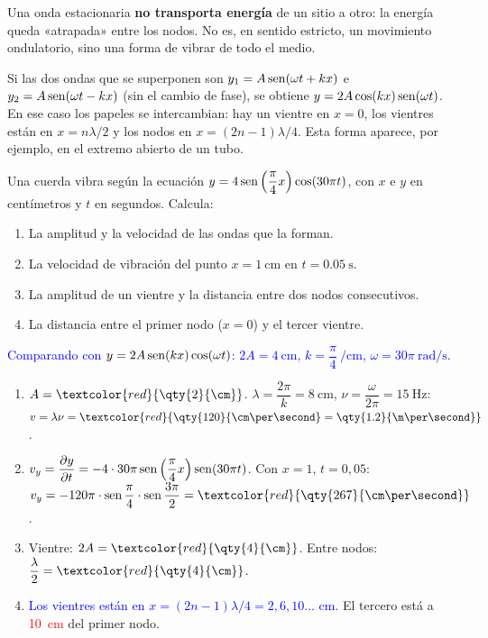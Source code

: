 \begin{remark}
    Una onda estacionaria \textbf{no transporta energía} de un sitio a otro: la energía queda «atrapada» entre los nodos.
    No es, en sentido estricto, un movimiento ondulatorio, sino una forma de vibrar de todo el medio.
\end{remark}

Si las dos ondas que se superponen son \(y_1 = A\operatorname{sen}(\omega t + kx)\) e \(y_2 = A\operatorname{sen}(\omega t - kx)\) (sin el cambio de
fase), se obtiene \(y = 2A\cos(kx)\operatorname{sen}(\omega t)\). En ese caso los papeles se intercambian: hay un vientre en \(x = 0\), los
vientres están en \(x = n\lambda/2\) y los nodos en \(x = (2n - 1)\lambda/4\). Esta forma aparece, por ejemplo, en el
extremo abierto de un tubo.

\begin{exercise}
    Una cuerda vibra según la ecuación \(y = 4\operatorname{sen}\left(\dfrac{\pi}{4}x\right)\cos(30\pi t)\), con \(x\) e \(y\) en
    centímetros y \(t\) en segundos. Calcula:
    \begin{enumerate}[label=\letraminuscula]
        \item La amplitud y la velocidad de las ondas que la forman.
        \item La velocidad de vibración del punto \(x = \qty{1}{\cm}\) en \(t = \qty{0.05}{\second}\).
        \item La amplitud de un vientre y la distancia entre dos nodos consecutivos.
        \item La distancia entre el primer nodo (\(x = 0\)) y el tercer vientre.
    \end{enumerate}
    \begin{solu}
        \textcolor{blue}{Comparando con \(y = 2A\operatorname{sen}(kx)\cos(\omega t)\): \(2A = \qty{4}{\cm}\), \(k = \dfrac{\pi}{4}\ \unit{\per\cm}\), \(\omega = 30\pi\ \unit{\radian\per\second}\).}
        \begin{enumerate}[label=\letraminuscula]
            \item \(A = \textcolor{red}{\qty{2}{\cm}}\). \(\lambda = \dfrac{2\pi}{k} = \qty{8}{\cm}\), \(\nu = \dfrac{\omega}{2\pi} = \qty{15}{\hertz}\):
            \(v = \lambda\nu = \textcolor{red}{\qty{120}{\cm\per\second} = \qty{1.2}{\m\per\second}}\).
            \item \(v_y = \dfrac{\partial y}{\partial t} = -4\cdot 30\pi\operatorname{sen}\left(\dfrac{\pi}{4}x\right)\operatorname{sen}(30\pi t)\).
            Con \(x = 1\), \(t = 0{,}05\): \(v_y = -120\pi\cdot\sen\dfrac{\pi}{4}\cdot\sen\dfrac{3\pi}{2} = \textcolor{red}{\qty{267}{\cm\per\second}}\).
            \item Vientre: \(2A = \textcolor{red}{\qty{4}{\cm}}\). Entre nodos: \(\dfrac{\lambda}{2} = \textcolor{red}{\qty{4}{\cm}}\).
            \item \textcolor{blue}{Los vientres están en \(x = (2n - 1)\lambda/4 = 2, 6, 10\ldots\) cm.} El tercero está a \textcolor{red}{\qty{10}{\cm}} del primer nodo.
        \end{enumerate}
    \end{solu}
\end{exercise}

